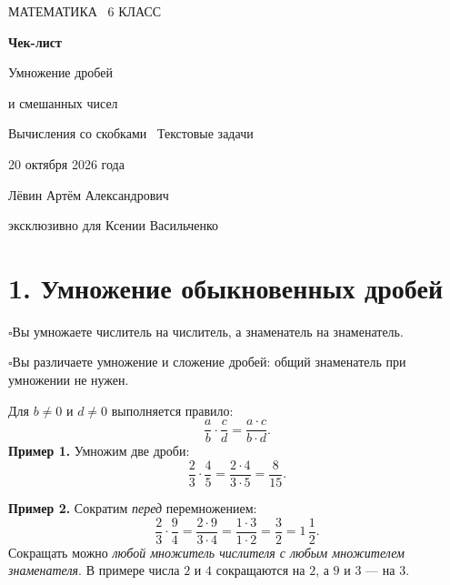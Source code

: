 \documentclass[a4paper,12pt]{article}
\newcommand{\sectionline}[1]{\section*{\color{darkaccent}#1}}
\newcommand{\learn}[1]{\par\noindent$\square$\enspace #1\par}
\newcommand{\mix}[3]{#1\,\frac{#2}{#3}}
\begin{document}
\hypersetup{pageanchor=false}
\begin{titlepage}
\thispagestyle{empty}
\centering
\vspace*{30mm}
{\color{accent}\large МАТЕМАТИКА \textbullet\ 6 КЛАСС\par}
\vspace{18mm}
{\color{darkaccent}\Huge\bfseries Чек-лист\par}
\vspace{9mm}
{\LARGE Умножение дробей\par}
\vspace{3mm}
{\Large и смешанных чисел\par}
\vspace{8mm}
{\large Вычисления со скобками \textbullet\ Текстовые задачи\par}
\vspace{19mm}
{\large 20 октября 2026 года\par}
\vfill
{\large Лёвин Артём Александрович\par}
\vspace{3mm}
{\normalsize эксклюзивно для Ксении Васильченко\par}
\vspace{34mm}
\end{titlepage}
\hypersetup{pageanchor=true}

\sectionline{1. Умножение обыкновенных дробей}
\learn{Вы умножаете числитель на числитель, а знаменатель на знаменатель.}
\learn{Вы различаете умножение и сложение дробей: общий знаменатель при умножении не нужен.}

Для $b\ne0$ и $d\ne0$ выполняется правило:
\[
\boxed{\frac ab\cdot\frac cd=\frac{a\cdot c}{b\cdot d}}.
\]
\textbf{Пример 1.} Умножим две дроби:
\[
\frac23\cdot\frac45=\frac{2\cdot4}{3\cdot5}=\boxed{\frac8{15}}.
\]

\textbf{Пример 2.} Сократим \emph{перед} перемножением:
\[
\frac23\cdot\frac94
=\frac{2\cdot9}{3\cdot4}
=\frac{1\cdot3}{1\cdot2}
=\frac32=\boxed{\mix{1}{1}{2}}.
\]
Сокращать можно \emph{любой множитель числителя с любым множителем
знаменателя}. В примере числа $2$ и $4$ сокращаются на $2$, а $9$ и $3$ --- на $3$.
\end{document}
